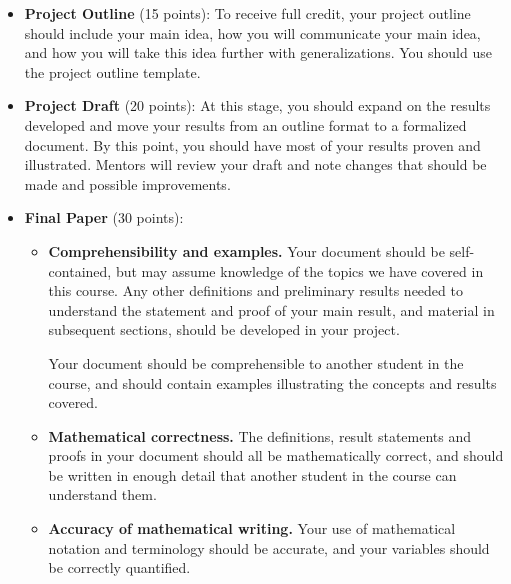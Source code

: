 \documentclass{article}
\begin{document}
\begin{itemize}
    \item \textbf{Project Outline} (15 points): To receive full credit, your project outline should include your main idea, how you will communicate your main idea, and how you will take this idea further with generalizations. You should use the project outline template.
    \item \textbf{Project Draft} (20 points): At this stage, you should expand on the results developed and move your results from an outline format to a formalized document. By this point, you should have most of your results proven and illustrated. Mentors will review your draft and note changes that should be made and possible improvements.
    \item \textbf{Final Paper} (30 points):
    \begin{itemize}
        \item \textbf{Comprehensibility and examples.}
        Your document should be self-contained, but may assume knowledge of the topics we have covered in this course. Any other definitions and preliminary results needed to understand the statement and proof of your main result, and material in subsequent sections, should be developed in your project.
        
        Your document should be comprehensible to another student in the course, and should contain examples illustrating the concepts and results covered.
        \item \textbf{Mathematical correctness.} The definitions, result statements and proofs in your document should all be mathematically correct, and should be written in enough detail that another student in the course can understand them.
        \item \textbf{Accuracy of mathematical writing.} Your use of mathematical notation and terminology should be accurate, and your variables should be correctly quantified.
    

\end{itemize}
\end{itemize}
\end{document}
